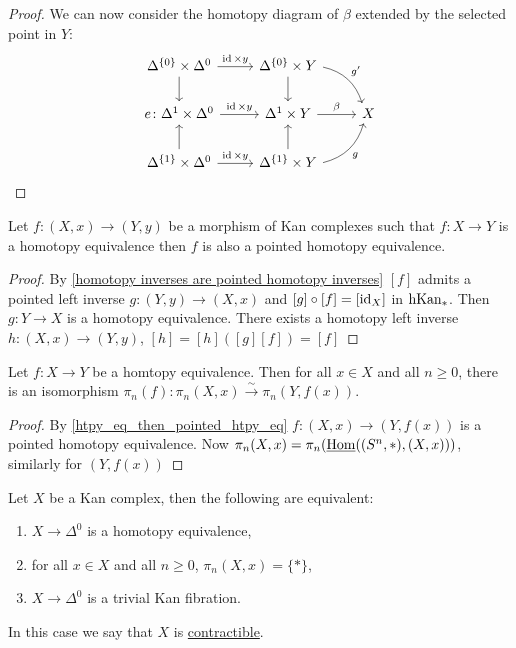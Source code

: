 \begin{proof}
    We can now consider the homotopy diagram of $\beta$ extended by the selected point in $Y$:
    \[
    \begin{tikzcd}
        \Delta^{\{0\}} \times \Delta^0
        \ar[r, "\id \times y"]
        \ar[d]
        &
        \Delta^{\{0\}} \times Y
        \ar[d]
        \ar[rd, bend left, "g'"]
        \\
        e\colon\Delta^1 \times \Delta^0
        \ar[r, "\id \times y"]
        &
        \Delta^1 \times Y
        \ar[r, "\beta"]
        &
        X
        \\
        \Delta^{\{1\}} \times \Delta^0
        \ar[u]
        \ar[r, "\id \times y"]
        &
        \Delta^{\{1\}} \times Y
        \ar[u]
        \ar[ru, bend right, "g"']
    \end{tikzcd}
    \]
\end{proof}

\begin{cor}
\label{htpy_eq_then_pointed_htpy_eq}
    Let $f\colon (X,x) \to (Y,y)$ be a morphism of Kan complexes such that $f \colon X \to Y$ is a homotopy equivalence then $f$ is also a pointed homotopy equivalence.
\end{cor}

\begin{proof}
    By \cref{homotopy inverses are pointed homotopy inverses} $[f]$ admits a pointed left inverse 
    $g\colon (Y,y) \to (X,x)$ and $[g] \circ [f] = [\operatorname{id}_X]$ in $\operatorname{hKan}_*$.
    Then $g\colon Y \to X$ is a homotopy equivalence.
    There exists a homotopy left inverse $h\colon (X,x) \to (Y,y)$, $[h]=[h]([g][f])=[f]$
\end{proof}

\begin{cor}
    Let $f\colon X \to Y$ be a homtopy equivalence. 
    Then for all $x \in X$ and all $n \geq 0$, there is an isomorphism $\pi_n(f)\colon \pi_n(X,x) \xrightarrow{\sim} \pi_n(Y,f(x))$.
\end{cor}

\begin{proof}
    By \cref{htpy_eq_then_pointed_htpy_eq} $f\colon (X,x) \to (Y,f(x))$ is a pointed homotopy equivalence.
    Now $\pi_n(X,x) = \pi_n ( \underline{\operatorname{Hom}}((S^n,*),(X,x)))$, similarly for $(Y,f(x))$
\end{proof}

\begin{defi/prop}  
\label{contractible Kan complex}
    Let $X$ be a Kan complex, then the following are equivalent:
    \begin{enumerate}
        \item  
        $X \to \Delta^0$ is a homotopy equivalence,
        \item 
        for all $x \in X$ and all $n \geq 0$, $\pi_n(X,x) = \{ *\}$,
        \item 
        $X \to \Delta^0$ is a trivial Kan fibration.
    \end{enumerate}
    In this case we say that $X$ is \underline{contractible}.
\end{defi/prop}

